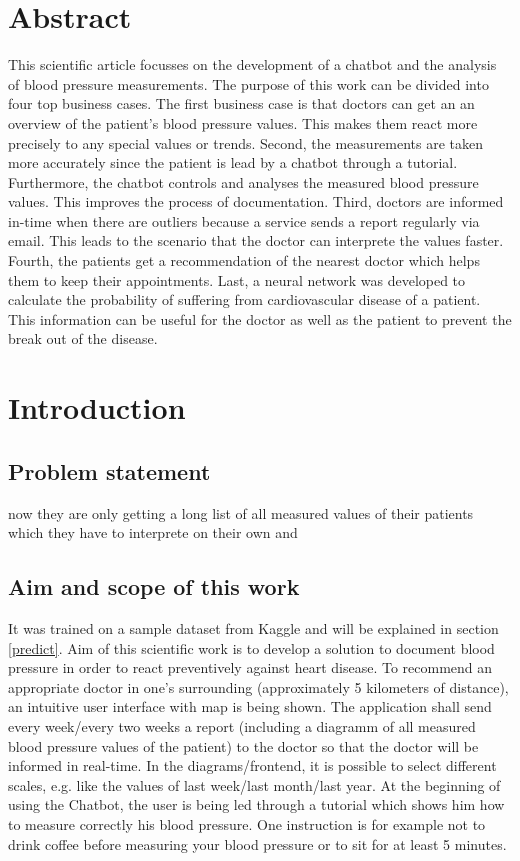 



\chapter{Abstract}\label{abstract}

This scientific article focusses on the development of a chatbot and the analysis of blood pressure measurements.
The purpose of this work can be divided into four top business cases. The first business case is that doctors can get an  an overview of the patient's blood pressure values. This makes them react more precisely to any special values or trends. 
Second, the measurements are taken more accurately since the patient is lead by a chatbot through a tutorial. Furthermore, the chatbot controls and analyses the measured blood pressure values. This improves the process of documentation.
Third, doctors are informed in-time when there are outliers because a service sends a report regularly via email. This leads to the scenario that the doctor can interprete the values faster.
Fourth, the patients get a recommendation of the nearest doctor which helps them to keep their appointments.
Last, a neural network was developed to calculate the probability of suffering from cardiovascular disease of a patient. This information can be useful for the doctor as well as the patient to prevent the break out of the disease.

\chapter{Introduction}\label{introduction}

\section{Problem statement}
now they are only getting a long list of all measured values of their patients which they have to interprete on their own and 

\section{Aim and scope of this work}
 It was trained on a sample dataset from Kaggle and will be explained in section \ref{predict}.
Aim of this scientific work is to develop a solution to document blood pressure in order to react preventively against heart disease.
To recommend an appropriate doctor in one's surrounding (approximately 5 kilometers of distance), an intuitive user interface with map is being shown.
The application shall send every week/every two weeks a report (including a diagramm of all measured blood pressure values of the patient) to the doctor so that the doctor will be informed in real-time. In the diagrams/frontend, it is possible to select different scales, e.g. like the values of last week/last month/last year. 
At the beginning of using the Chatbot, the user is being led through a tutorial which shows him how to measure correctly his blood pressure. One instruction is for example not to drink coffee before measuring your blood pressure or to sit for at least 5 minutes.

